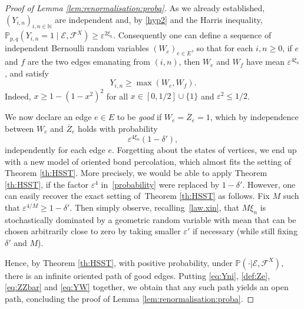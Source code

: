 \documentclass[pdflatex,sn-mathphys-num]{sn-jnl}%
\newcommand{\cE}{\ensuremath{\mathcal E}}
\newcommand{\cF}{\ensuremath{\mathcal F}}
\newcommand{\bbN}{{\ensuremath{\mathbb N}} }
\newcommand{\bbP}{{\ensuremath{\mathbb P}} }
\newcommand{\1}{{\ensuremath{\mathbf{1}}} }
\theoremstyle{thmstyleone}%
\theoremstyle{thmstyletwo}%
\theoremstyle{thmstylethree}%
\begin{document}
\begin{proof}[Proof of Lemma \ref{lem:renormalisation:proba}]
As we already established, $(Y_{i,n})_{i,n\in\bbN}$ are independent and, 
by \eqref{hyp2} and the Harris inequality, $\bbP_{p,q}(Y_{i,n}=1\mid\cE,\cF^X)\ge \varepsilon^{2\xi_n}$.
Consequently one can define a sequence of independent Bernoulli random variables $(W_e)_{e\in E}$, so 
that for each $i,n\ge 0$, if $e$ and $f$ are the two edges emanating from $(i,n)$, then $W_e$ and $W_f$ have mean $\varepsilon^{4\xi_n}$, and satisfy  
\begin{equation}
\label{eq:YW}Y_{i,n}  \ge \max (W_e,W_f).
\end{equation}
Indeed, $x\ge 1-(1-x^2)^2$ for all $x\in[0,1/2]\cup\{1\}$ and $\varepsilon^2\le 1/2$.

We now declare an edge $e\in E$ to be \textit{good} 
if $W_e= \overline Z_e= 1$, which by independence between $W_e$ and $\overline Z_e$ holds with probability
\begin{equation}\label{probability}
\varepsilon^{4\xi_n}(1-\delta'),
\end{equation} 
independently for each edge $e$. Forgetting about the states of vertices, we end up with a new model of oriented bond percolation, 
which almost fits the setting of Theorem \ref{th:HSST}.
More precisely, we would be able to apply Theorem \ref{th:HSST}, if the factor $\varepsilon^4$ in~\eqref{probability} were replaced by $1-\delta'$. However, 
one can easily  recover the exact setting of~Theorem \ref{th:HSST} as follows. Fix $M$ such that $\varepsilon^{4/M}\ge 1- \delta'$. Then simply observe, recalling~\eqref{law.xin}, that $M\xi_n$ is stochastically dominated by a geometric random variable with mean that can be chosen arbitrarily close to zero by taking smaller $\varepsilon'$ if necessary (while still fixing $\delta'$ and $M$).

Hence, by Theorem \ref{th:HSST}, with positive probability, under $\bbP(\cdot|\cE,\cF^X)$, there is an infinite oriented path of good edges. Putting \eqref{eq:Yni}, \eqref{def:Ze}, \eqref{eq:ZZbar} and \eqref{eq:YW} together, we obtain that any such path yields an open path, concluding the proof of Lemma \ref{lem:renormalisation:proba}.
\end{proof}
\end{document}
